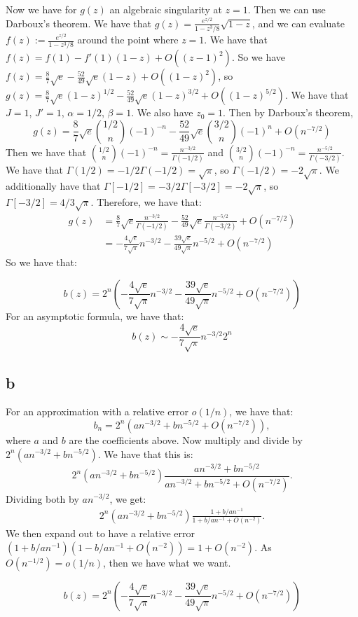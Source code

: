 \documentclass[]{article}
\theoremstyle{definition}
\numberwithin{theorem}{section}
\numberwithin{equation}{section}
\begin{document}
Now we have for $g(z)$ an algebraic singularity at $z = 1$. Then we can use Darboux's theorem. We have that $g(z) = \frac{e^{z/2}}{1 - z^3/8} \sqrt{1 - z}$, and we can evaluate $f(z) := \frac{e^{z/2}}{1 - z^3/8} $ around the point where $z = 1$. 
We have that $f(z) = f(1) - f'(1) (1 - z) + O((z - 1)^2)$. So we have $f(z) = \frac{8}{7}\sqrt{e} -  \frac{52}{49}\sqrt{e}(1-z) + O((1 - z)^2)$, so $g(z) = \frac{8}{7}\sqrt{e}(1 - z)^{1/2} -  \frac{52}{49}\sqrt{e}(1-z)^{3/2} + O((1 - z)^{5/2})$. 
We have that $J = 1$, $J' = 1$, $\alpha = 1/2$, $\beta = 1$. We also have $z_0 = 1$.
Then by Darboux's theorem, 
\begin{equation}
	[z^n] g(z) = \frac{8}{7}\sqrt{e} \binom{1/2}{n} (-1)^{-n} -  \frac{52}{49}\sqrt{e} \binom{3/2}{n}(-1)^n + O(n^{-7/2})
\end{equation}
Then we have that $\binom{1/2}{n} (-1)^{-n} = \frac{n^{-3/2}}{\Gamma(-1/2)}$ and  $\binom{3/2}{n} (-1)^{-n} = \frac{n^{-5/2}}{\Gamma(-3/2)}$. 
We have that $\Gamma(1/2) = -1/2 \Gamma(-1/2) = \sqrt{\pi}$, so $\Gamma(-1/2) = - 2 \sqrt{\pi}$. We additionally have that $\Gamma[-1/2] = -3/2 \Gamma[-3/2] = -2 \sqrt{\pi}$, so $\Gamma[-3/2] = 4/3 \sqrt{\pi}$. Therefore, we have that:
\begin{align*}
	[z^n] g(z) &= \frac{8}{7}\sqrt{e} \frac{n^{-3/2}}{\Gamma(-1/2)} -  \frac{52}{49}\sqrt{e} \frac{n^{-5/2}}{\Gamma(-3/2)} + O(n^{-7/2})\\
	&= -\frac{4 \sqrt{e}}{7 \sqrt{\pi}} n^{-3/2} - \frac{39 \sqrt{e}}{49\sqrt{\pi}} n^{-5/2} + O(n^{-7/2})
\end{align*}
So we have that:

\begin{equation}
	[z^n] b(z) = 2^n \left( -\frac{4 \sqrt{e}}{7 \sqrt{\pi}} n^{-3/2} - \frac{39 \sqrt{e}}{49\sqrt{\pi}} n^{-5/2} + O(n^{-7/2})\right)
\end{equation}
For an asymptotic formula, we have that:
\begin{equation}
	[z^n] b(z) \sim -\frac{4 \sqrt{e}}{7 \sqrt{\pi}} n^{-3/2} 2^n
\end{equation}
\subsection{b}
For an approximation with a relative error $o(1/n)$, we have that:
\begin{equation}
	b_n = 2^n ( a n^{-3/2} + b n^{-5/2} + O(n^{-7/2})),
\end{equation}
where $a$ and $b$ are the coefficients above. 
Now multiply and divide by $2^n(a n^{-3/2} + b n^{-5/2})$. We have that this is:
\begin{equation}
	2^n(a n^{-3/2} + b n^{-5/2}) \frac{a n^{-3/2} + b n^{-5/2}}{a n^{-3/2} + b n^{-5/2} + O(n^{-7/2})}.
\end{equation}
Dividing both by $a n^{-3/2}$, we get:
\begin{align*}
	2^n(a n^{-3/2} + b n^{-5/2}) \frac{1 + b/a n^{-1}}{1 + b/a n^{-1} + O(n^{-2})}.
\end{align*}
We then expand out to have a relative error $(1 + b/a n^{-1}) (1 -b/a n^{-1} + O(n^{-2})) = 1 + O(n^{-2})$. As $O(n^{-1/2})  = o(1/n)$, then we have what we want. 

\begin{equation}
	[z^n] b(z) = 2^n \left( -\frac{4 \sqrt{e}}{7 \sqrt{\pi}} n^{-3/2} - \frac{39 \sqrt{e}}{49\sqrt{\pi}} n^{-5/2} + O(n^{-7/2})\right)
\end{equation}
\end{document}
